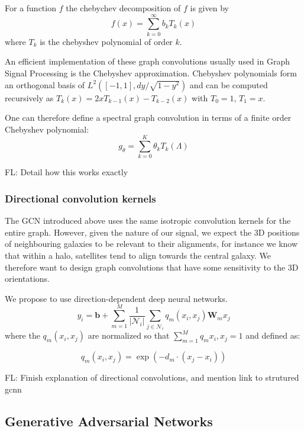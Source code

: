 \documentclass[a4paper,fleqn,usenatbib]{mnras}
\newcommand{\fl}[1]{{\color{magenta}FL: #1}}
\begin{document}
For a function $f$ the chebychev decomposition of $f$ is given by 
\begin{equation}
	f(x) = \sum\limits_{k=0}^{\infty} b_{k} T_k(x)
\end{equation}
where $T_k$ is the  chebyshev polynomial of order $k$.

An efficient implementation of these graph convolutions usually used in Graph Signal Processing is the Chebyshev approximation. Chebyshev polynomials form an orthogonal basis of $L^2([-1,1], dy/\sqrt{1 - y^2})$ and can be computed recursively as $T_k(x) = 2x T_{k-1}(x) - T_{k-2}(x)$ with $T_0 =1$, $T_1 = x$.  

One can therefore define a spectral graph convolution in terms of a finite order Chebyshev polynomial:
\begin{equation}
	g_\theta = \sum_{k=0}^K \theta_k T_k(\Lambda)
\end{equation}

\fl{Detail how this works exactly}

\subsubsection{Directional convolution kernels}

The GCN introduced above uses the same isotropic convolution kernels for the entire graph. However, given the  nature of our signal, we expect the 3D positions of neighbouring galaxies to be relevant to their alignments, for instance we know that within a halo, satellites tend to align towards the central galaxy. We therefore want to design graph convolutions that have some sensitivity to the 3D orientations. 

We propose to use  direction-dependent  deep neural networks.
\begin{equation}
	y_i=  \mathbf{b} +  \sum\limits_{m=1}^{M} \frac{1}{|\mathcal{N}_i|} \sum_{j \in \mathcal{N}_i} q_m(x_i, x_j) \mathbf{W}_m x_j 
\end{equation}
where the  $q_m(x_i, x_j)$ are normalized so that $\sum_{m=1}^{M} q_m{x_i, x_j} = 1$ and defined as:

\begin{equation}
		q_m(x_i, x_j) = \exp(- d_m \cdot (x_j - x_i))
\end{equation}

\fl{Finish explanation of directional convolutions, and mention link to strutured gcnn}

\subsection{Generative Adversarial Networks}
\end{document}
